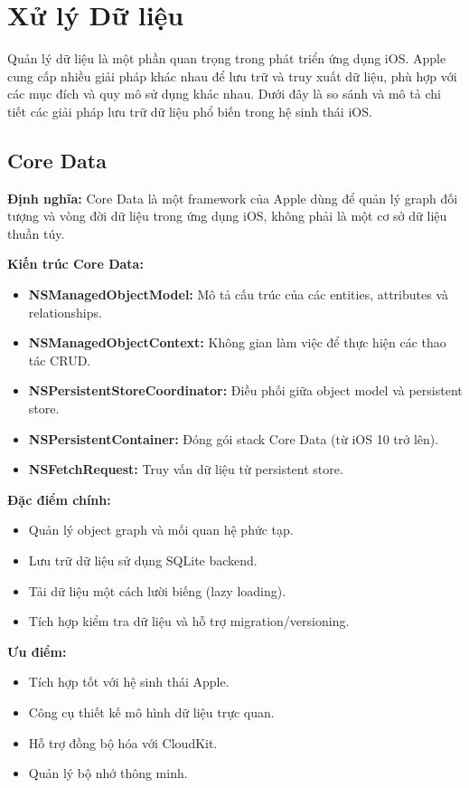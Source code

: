 \section{Xử lý Dữ liệu}

Quản lý dữ liệu là một phần quan trọng trong phát triển ứng dụng iOS. Apple cung cấp nhiều giải pháp khác nhau để lưu trữ và truy xuất dữ liệu, phù hợp với các mục đích và quy mô sử dụng khác nhau. Dưới đây là so sánh và mô tả chi tiết các giải pháp lưu trữ dữ liệu phổ biến trong hệ sinh thái iOS.

\subsection{Core Data}

\textbf{Định nghĩa:} Core Data là một framework của Apple dùng để quản lý graph đối tượng và vòng đời dữ liệu trong ứng dụng iOS, không phải là một cơ sở dữ liệu thuần túy. 

\textbf{Kiến trúc Core Data:}
\begin{itemize}
    \item \textbf{NSManagedObjectModel:} Mô tả cấu trúc của các entities, attributes và relationships.
    \item \textbf{NSManagedObjectContext:} Không gian làm việc để thực hiện các thao tác CRUD.
    \item \textbf{NSPersistentStoreCoordinator:} Điều phối giữa object model và persistent store.
    \item \textbf{NSPersistentContainer:} Đóng gói stack Core Data (từ iOS 10 trở lên).
    \item \textbf{NSFetchRequest:} Truy vấn dữ liệu từ persistent store.
\end{itemize}

\textbf{Đặc điểm chính:}
\begin{itemize}
    \item Quản lý object graph và mối quan hệ phức tạp.
    \item Lưu trữ dữ liệu sử dụng SQLite backend.
    \item Tải dữ liệu một cách lười biếng (lazy loading).
    \item Tích hợp kiểm tra dữ liệu và hỗ trợ migration/versioning.
\end{itemize}

\textbf{Ưu điểm:}
\begin{itemize}
    \item Tích hợp tốt với hệ sinh thái Apple.
    \item Công cụ thiết kế mô hình dữ liệu trực quan.
    \item Hỗ trợ đồng bộ hóa với CloudKit.
    \item Quản lý bộ nhớ thông minh.
\end{itemize}

